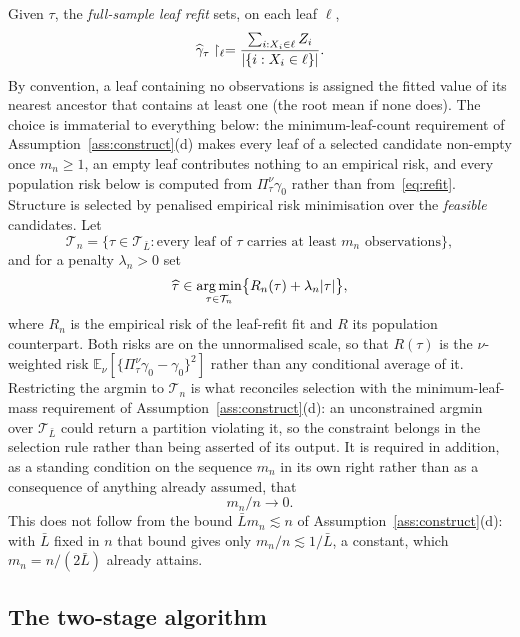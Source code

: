 \documentclass[11pt]{article}
\theoremstyle{plain}
\theoremstyle{definition}
\theoremstyle{remark}
\newcommand{\E}{\mathbb{E}}
\newcommand{\cT}{\mathcal{T}}
\DeclareMathOperator*{\argmin}{arg\,min}
\DeclarePairedDelimiter{\card}{\lvert}{\rvert}
\begin{document}
Given $\tau$, the \emph{full-sample leaf refit} sets, on each leaf $\ell$,
\begin{equation}\label{eq:refit}
  \widehat\gamma_\tau\restriction_\ell
  =\frac{\sum_{i:X_i\in\ell}Z_i}{\card{\{i:X_i\in\ell\}}} .
\end{equation}
By convention, a leaf containing no observations is assigned the fitted value
of its nearest ancestor that contains at least one (the root mean if none
does). The choice is immaterial to everything below: the minimum-leaf-count
requirement of Assumption~\ref{ass:construct}(d) makes every leaf of a
selected candidate non-empty once $m_n\ge1$, an empty leaf contributes nothing
to an empirical risk, and every population risk below is computed from
$\Pi^\nu_\tau\gamma_0$ rather than from~\eqref{eq:refit}.
Structure is selected by penalised empirical risk minimisation over the
\emph{feasible} candidates. Let
\begin{equation}\label{eq:feasible}
  \cT_n=\bigl\{\tau\in\cT_{\bar L}:\text{every leaf of }\tau\text{ carries
   at least }m_n\text{ observations}\bigr\},
\end{equation}
and for a penalty $\lambda_n>0$ set
\begin{equation}\label{eq:select}
  \widehat\tau\in\argmin_{\tau\in\cT_n}
  \bigl\{R_n(\tau)+\lambda_n\card\tau\bigr\},
\end{equation}
where $R_n$ is the empirical risk of the leaf-refit fit and $R$ its population
counterpart. Both risks are on the unnormalised scale, so that $R(\tau)$ is
the $\nu$-weighted risk $\E_\nu[\{\Pi^\nu_\tau\gamma_0-\gamma_0\}^2]$ rather
than any conditional average of it. Restricting the argmin to $\cT_n$ is what
reconciles selection with the minimum-leaf-mass requirement of
Assumption~\ref{ass:construct}(d): an unconstrained argmin over
$\cT_{\bar L}$ could return a partition violating it, so the constraint
belongs in the selection rule rather than being asserted of its output. It is
required in addition, as a standing condition on the sequence $m_n$ in its own
right rather than as a consequence of anything already assumed, that
\[
  m_n/n\to0 .
\]
This does not follow from the bound $\bar Lm_n\lesssim n$ of
Assumption~\ref{ass:construct}(d): with $\bar L$ fixed in $n$ that bound gives
only $m_n/n\lesssim1/\bar L$, a constant, which $m_n=n/(2\bar L)$ already
attains.

\subsection{The two-stage algorithm}\label{sec:setup-algorithm}
\end{document}
